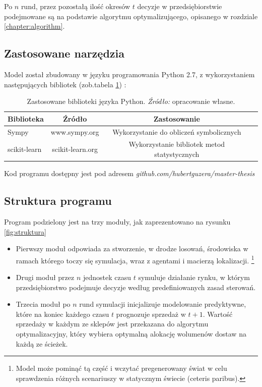 \documentclass[polish, twoside, 12pt, a4paper]{article}
\theoremstyle{definition}
\theoremstyle{plain}
\theoremstyle{remark}
\begin{document}
Po $n$ rund, przez pozostałą ilość okresów $t$ decyzje w przedsiębiorstwie podejmowane są na podstawie algorytmu optymalizującego, opisanego w rozdziale \ref{chapter:algorithm}. 

\subsection{Zastosowane narzędzia}

Model został zbudowany w języku programowania Python 2.7, z wykorzystaniem następujących bibliotek (zob.tabela \ref{tab:biblioteki}) : 

\begin{table}[hbt]
  \centering
  \captionsetup{margin=10pt,font=small,labelfont=bf,width=.8\textwidth}
  \caption[Zastosowane biblioteki języka Python]{Zastosowane biblioteki języka Python. \textit{Źródło:} opracowanie własne.}
  \label{tab:biblioteki}
\vspace*{2ex}
  \begin{tabular}{lccc}
 Biblioteka & Źródło & Zastosowanie \\ 
\hline
 Sympy & www.sympy.org & Wykorzystanie do obliczeń symbolicznych \\  
 scikit-learn & scikit-learn.org & Wykorzystanie bibliotek metod statystycznych \\ \hline
  \end{tabular}
\end{table}


Kod programu dostępny jest pod adresem  \textit{github.com/hubertguzera/master-thesis}

\subsection{Struktura programu}

Program podzielony jest na trzy moduły, jak zaprezentowano na rysunku \ref{fig:struktura}

	\begin{itemize}
		\item Pierwszy moduł odpowiada za stworzenie, w drodze losowań, środowiska w ramach którego toczy się symulacja, wraz z agentami i macierzą lokalizacji. \footnote{Model może pominąć tą część i wczytać pregenerowany świat w celu sprawdzenia różnych scenariuszy w statycznym świecie (ceteris paribus).}
		\item  Drugi moduł przez $n$ jednostek czasu $t$ symuluje działanie rynku, w którym przedsiębiorstwo podejmuje decyzje według predefiniowanych zasad sterowań.
		\item Trzecia moduł po $n$ rund symulacji inicjalizuje modelowanie predyktywne, które na koniec każdego czasu $t$ prognozuje sprzedaż w $t+1$. Wartość sprzedaży w każdym ze sklepów jest przekazana do algorytmu optymalizacyjny, który wybiera optymalną alokację wolumenów dostaw na każdą ze ścieżek. 
	\end{itemize}
\end{document}
